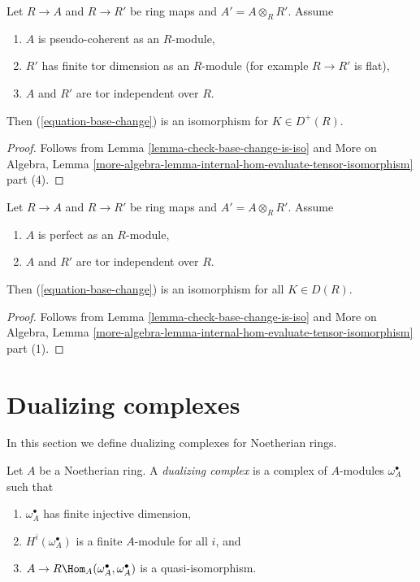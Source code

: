 \begin{lemma}
\label{lemma-flat-bc-surjection}
Let $R \to A$ and $R \to R'$ be ring maps and $A' = A \otimes_R R'$.
Assume
\begin{enumerate}
\item $A$ is pseudo-coherent as an $R$-module,
\item $R'$ has finite tor dimension as an $R$-module (for example
$R \to R'$ is flat),
\item $A$ and $R'$ are tor independent over $R$.
\end{enumerate}
Then (\ref{equation-base-change}) is an isomorphism for $K \in D^+(R)$.
\end{lemma}

\begin{proof}
Follows from Lemma \ref{lemma-check-base-change-is-iso} and
More on Algebra, Lemma
\ref{more-algebra-lemma-internal-hom-evaluate-tensor-isomorphism} part (4).
\end{proof}

\begin{lemma}
\label{lemma-bc-surjection}
Let $R \to A$ and $R \to R'$ be ring maps and $A' = A \otimes_R R'$.
Assume
\begin{enumerate}
\item $A$ is perfect as an $R$-module,
\item $A$ and $R'$ are tor independent over $R$.
\end{enumerate}
Then (\ref{equation-base-change}) is an isomorphism for all $K \in D(R)$.
\end{lemma}

\begin{proof}
Follows from Lemma \ref{lemma-check-base-change-is-iso} and
More on Algebra, Lemma
\ref{more-algebra-lemma-internal-hom-evaluate-tensor-isomorphism} part (1).
\end{proof}







\section{Dualizing complexes}
\label{section-dualizing}

\noindent
In this section we define dualizing complexes for Noetherian rings.

\begin{definition}
\label{definition-dualizing}
Let $A$ be a Noetherian ring. A {\it dualizing complex} is a
complex of $A$-modules $\omega_A^\bullet$ such that
\begin{enumerate}
\item $\omega_A^\bullet$ has finite injective dimension,
\item $H^i(\omega_A^\bullet)$ is a finite $A$-module for all $i$, and
\item $A \to R\Hom_A(\omega_A^\bullet, \omega_A^\bullet)$
is a quasi-isomorphism.
\end{enumerate}
\end{definition}

